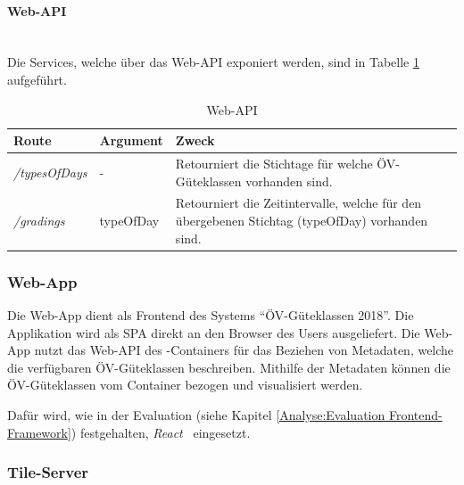 \paragraph{Web-\ac{API}}~\\
Die Services, welche über das Web-\ac{API} exponiert werden, sind in Tabelle \ref{table:Wep-API} aufgeführt.

\begin{table}[H]
    \centering
    \begin{tabular}[c]{l l p{10.5cm}}
        \toprule
        \textbf{Route}          
                                & \textbf{Argument}
                                & \textbf{Zweck}\\
        \midrule
        \emph{/typesOfDays}
                                & -
                                & Retourniert die Stichtage für welche \acs{ÖV}-Güteklassen vorhanden sind.\\
        \emph{/gradings}        & typeOfDay
                                & Retourniert die Zeitintervalle, welche für den übergebenen Stichtag (typeOfDay) vorhanden sind.\\
        \bottomrule
    \end{tabular}
    \caption{Web-\ac{API}}
    \label{table:Wep-API}
\end{table}


\subsubsection{Web-App}
\label{container:Web-App}

Die Web-App dient als Frontend des Systems "`\acs{ÖV}-Güteklassen 2018"'.
Die Applikation wird als \ac{SPA} direkt an den Browser des Users ausgeliefert.
Die Web-App nutzt das Web-\ac{API} des -Containers für das Beziehen von Metadaten, welche die verfügbaren ÖV-Güteklassen beschreiben.
Mithilfe der Metadaten können die ÖV-Güteklassen vom Container  bezogen und visualisiert werden.

Dafür wird, wie in der Evaluation (siehe Kapitel \ref{Analyse:Evaluation Frontend-Framework}) festgehalten, \emph{React}~\cite{react} eingesetzt.

\subsubsection{Tile-Server}
\label{container:Tile-Server}

